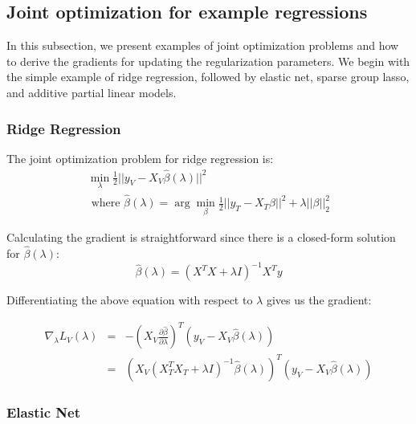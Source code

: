 \documentclass[10pt,letterpaper]{article}
\begin{document}
\subsection{Joint optimization for example regressions}

In this subsection, we present examples of joint optimization problems and how to derive the gradients for updating the regularization parameters. We begin with the simple example of ridge regression, followed by elastic net, sparse group lasso, and additive partial linear models.

\subsubsection{Ridge Regression}

The joint optimization problem for ridge regression is:
\begin{equation}
\begin{array}{c}
\min_\lambda \frac{1}{2} \lvert\lvert y_V - X_V \hat \beta (\lambda) \rvert\rvert ^2 \\
\text{  where  } \hat \beta (\lambda) = \arg \min_\beta \frac{1}{2} \lvert\lvert y_T - X_T \beta \rvert\rvert ^2 + \lambda \lvert\lvert \beta \rvert\rvert_2^2
\end{array}
\end{equation}

Calculating the gradient is straightforward since there is a closed-form solution for $\hat \beta(\lambda)$:
\begin{equation}
\hat \beta (\lambda) = (X^TX + \lambda I)^{-1}X^Ty
\end{equation}

Differentiating the above equation with respect to $\lambda$ gives us the gradient:

\begin{equation}
\begin{array} {lcl}
\nabla_\lambda L_V(\lambda) &=& - (X_V \frac{\partial \hat\beta}{\partial \lambda})^T (y_V - X_V \hat \beta (\lambda)) \\
&=& (X_V(X_T^T X_T + \lambda I)^{-1}\hat \beta (\lambda))^T(y_V - X_V \hat\beta (\lambda))
\end{array}
\end{equation}

\subsubsection{Elastic Net}
\end{document}
